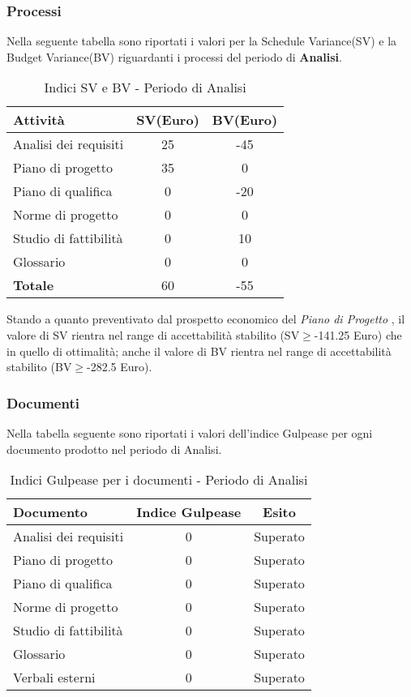       \subsubsection{Processi}
      Nella seguente tabella sono riportati i valori per la Schedule Variance(SV) e la Budget Variance(BV) riguardanti i processi del periodo di \textbf{Analisi}.\\
      \begin{table}[H]
        \centering
        \begin{tabular}{|l|c|c|}
          \hline
          \textbf{Attività} &\textbf{SV}(Euro)  &\textbf{BV}(Euro) \\
          \hline
          Analisi dei requisiti  &25 &-45  \\
          Piano di progetto &35  &0\\
          Piano di qualifica  &0  &-20\\
          Norme di progetto &0  &0 \\
          Studio di fattibilità &0  &10  \\
          Glossario &0  &0  \\
          \hline
          \textbf{Totale} &60  &-55  \\
          \hline
        \end{tabular}
        \caption{Indici SV e BV - Periodo di Analisi}
      \end{table}
      Stando a quanto preventivato dal prospetto economico del \emph{Piano di Progetto \VersionePP{}}, il valore di SV rientra nel range di accettabilità stabilito (SV\(\geq\)-141.25 Euro) che in quello di ottimalità;
      anche il valore di BV rientra nel range di accettabilità stabilito (BV\(\geq\)-282.5 Euro).
      \subsubsection{Documenti}
      Nella tabella seguente sono riportati i valori dell'indice Gulpease per ogni documento prodotto nel periodo di Analisi.\\
      \begin{table}[H]
        \centering
        \begin{tabular}{|l|c|c|}
          \hline
          \textbf{Documento} &\textbf{Indice Gulpease} &\textbf{Esito}\\
          \hline
          Analisi dei requisiti &0  &Superato \\
          Piano di progetto &0  &Superato \\
          Piano di qualifica  &0  &Superato \\
          Norme di progetto &0  &Superato \\
          Studio di fattibilità &0  &Superato \\
          Glossario &0  &Superato  \\
          Verbali esterni &0  &Superato \\
          \hline
        \end{tabular}
        \caption{Indici Gulpease per i documenti - Periodo di Analisi}
      \end{table}
